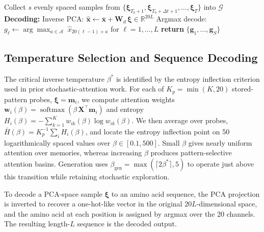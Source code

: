 \documentclass[11pt,onecolumn,twoside,lineno]{pnas-new}
\begin{document}
{\begin{algorithm}[h!]
\begin{algorithmic}[1]
    \EndFor
    \State Collect $s$ evenly spaced samples from $\{\boldsymbol{\xi}_{T_b+1}, \boldsymbol{\xi}_{T_b+\Delta t+1}, \ldots, \boldsymbol{\xi}_T\}$ into $\mathcal{G}$
\EndFor
\State \textbf{Decoding:}
    \State Inverse PCA: $\hat{\mathbf{x}} \leftarrow \bar{\mathbf{x}} + \mathbf{W}_d\,\boldsymbol{\xi} \in \mathbb{R}^{20L}$
    \State Argmax decode: $g_\ell \leftarrow \arg\max_{a \in \mathcal{A}}\; \hat{x}_{20(\ell-1)+a}$ \; for $\ell = 1,\ldots,L$
\EndFor
\State \textbf{return} $\{\mathbf{g}_1, \ldots, \mathbf{g}_S\}$
\end{algorithmic}
\end{algorithm}

\subsection*{Temperature Selection and Sequence Decoding}
The critical inverse temperature $\beta^*$ is identified by the entropy inflection criterion used in prior stochastic-attention work. For each of $K_p=\min(K,20)$ stored-pattern probes, $\boldsymbol{\xi}=\mathbf{m}_i$, we compute attention weights $\mathbf{w}_i(\beta)=\operatorname{softmax}(\beta\,\mathbf{X}^\top\mathbf{m}_i)$ and entropy $H_i(\beta)=-\sum_{k=1}^K w_{ik}(\beta)\log w_{ik}(\beta)$. We then average over probes, $\bar H(\beta)=K_p^{-1}\sum_i H_i(\beta)$, and locate the entropy inflection point on 50 logarithmically spaced values over $\beta \in [0.1,500]$. Small $\beta$ gives nearly uniform attention over memories, whereas increasing $\beta$ produces pattern-selective attention basins. Generation uses $\beta_{\mathrm{gen}}=\max(\lceil 2\beta^*\rceil,5)$ to operate just above this transition while retaining stochastic exploration.

To decode a PCA-space sample $\boldsymbol{\xi}$ to an amino acid sequence, the PCA projection is inverted to recover a one-hot-like vector in the original $20L$-dimensional space, and the amino acid at each position is assigned by argmax over the 20 channels. The resulting length-$L$ sequence is the decoded output.

}
\end{document}
